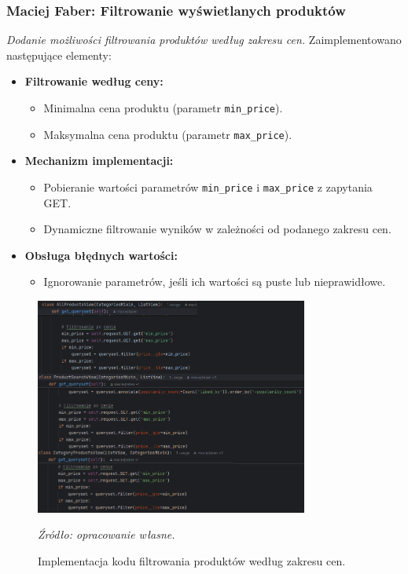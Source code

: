 \documentclass[12pt,a4paper,oneside]{article}
\theoremstyle{definition}
\numberwithin{equation}{section}
\begin{document}
\subsubsection{Maciej Faber: Filtrowanie wyświetlanych produktów}
\label{section:1.3.45}
\textit{
Dodanie możliwości filtrowania produktów według zakresu cen.
}
Zaimplementowano następujące elementy:
\begin{itemize}
    \item \textbf{Filtrowanie według ceny:}
    \begin{itemize}
        \item Minimalna cena produktu (parametr \texttt{min\_price}).
        \item Maksymalna cena produktu (parametr \texttt{max\_price}).
    \end{itemize}
    \item \textbf{Mechanizm implementacji:}
    \begin{itemize}
        \item Pobieranie wartości parametrów \texttt{min\_price} i \texttt{max\_price} z zapytania GET.
        \item Dynamiczne filtrowanie wyników w zależności od podanego zakresu cen.
    \end{itemize}
    \item \textbf{Obsługa błędnych wartości:}
    \begin{itemize}
        \item Ignorowanie parametrów, jeśli ich wartości są puste lub nieprawidłowe.
    \end{itemize}
\end{itemize}
\begin{figure}[H]
    \centering
    \includegraphics[width=0.8\textwidth]{images/krzysztofBImages/filter_price.png}
    \caption{Implementacja kodu filtrowania produktów według zakresu cen.}
    \emph{Źródło: opracowanie własne.}
    \label{fig:filtering_products}
\end{figure}
\end{document}
